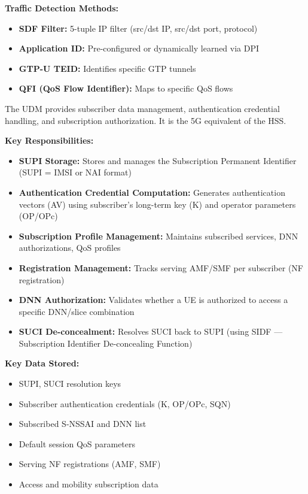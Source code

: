 \textbf{Traffic Detection Methods:}

\begin{itemize}
\tightlist
\item
  \textbf{SDF Filter:} 5-tuple IP filter (src/\allowbreak{}dst IP, src/\allowbreak{}dst port, protocol)
\item
  \textbf{Application ID:} Pre-configured or dynamically learned via DPI
\item
  \textbf{GTP-U TEID:} Identifies specific GTP tunnels
\item
  \textbf{QFI (QoS Flow Identifier):} Maps to specific QoS flows
\end{itemize}


The UDM provides subscriber data management, authentication credential handling, and subscription authorization. It is the 5G equivalent of the HSS.

\textbf{Key Responsibilities:}

\begin{itemize}
\tightlist
\item
  \textbf{SUPI Storage:} Stores and manages the Subscription Permanent Identifier (SUPI = IMSI or NAI format)
\item
  \textbf{Authentication Credential Computation:} Generates authentication vectors (AV) using subscriber’s long-term key (K) and operator parameters (OP/\allowbreak{}OPc)
\item
  \textbf{Subscription Profile Management:} Maintains subscribed services, DNN authorizations, QoS profiles
\item
  \textbf{Registration Management:} Tracks serving AMF/\allowbreak{}SMF per subscriber (NF registration)
\item
  \textbf{DNN Authorization:} Validates whether a UE is authorized to access a specific DNN/\allowbreak{}slice combination
\item
  \textbf{SUCI De-concealment:} Resolves SUCI back to SUPI (using SIDF — Subscription Identifier De-concealing Function)
\end{itemize}

\textbf{Key Data Stored:}

\begin{itemize}
\tightlist
\item
  SUPI, SUCI resolution keys
\item
  Subscriber authentication credentials (K, OP/\allowbreak{}OPc, SQN)
\item
  Subscribed S-NSSAI and DNN list
\item
  Default session QoS parameters
\item
  Serving NF registrations (AMF, SMF)
\item
  Access and mobility subscription data
\end{itemize}

